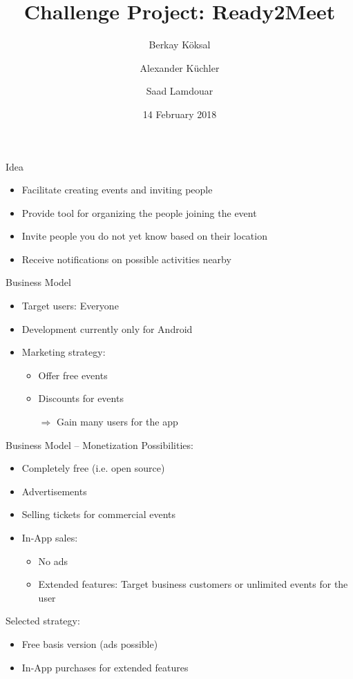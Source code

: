 \documentclass[logo=EURECOM,english]{eurecombeamer}
\date{14 February 2018}
\title{Challenge Project: Ready2Meet}
\author{Berkay K\"oksal \and Alexander K\"uchler \and Saad Lamdouar}
\institute{\EURECOMname}
\begin{document}
\maketitleframeEURECOM

\begin{frame}{Idea}
\begin{itemize}
\item Facilitate creating events and inviting people
\item Provide tool for organizing the people joining the event
\item Invite people you do not yet know based on their location
\item Receive notifications on possible activities nearby
\end{itemize}
\end{frame}

\begin{frame}{Business Model}
\begin{itemize}
\item Target users: Everyone
\item Development currently only for Android

\item Marketing strategy:
	\begin{itemize}
	\item Offer free events
	\item Discounts for events
	\item[$\Rightarrow$] Gain many users for the app
	\end{itemize}
\end{itemize}
\end{frame}

\begin{frame}{Business Model -- Monetization}
Possibilities:
\begin{itemize}
\item Completely free (i.e. open source)
\item Advertisements
\item Selling tickets for commercial events
\item In-App sales:
	\begin{itemize}
	\item No ads
	\item Extended features: Target business customers or unlimited events for the user\bigskip
	\end{itemize}
\end{itemize}

Selected strategy:
\begin{itemize}
\item Free basis version (ads possible)
\item In-App purchases for extended features
\end{itemize}
\end{frame}
\end{document}
